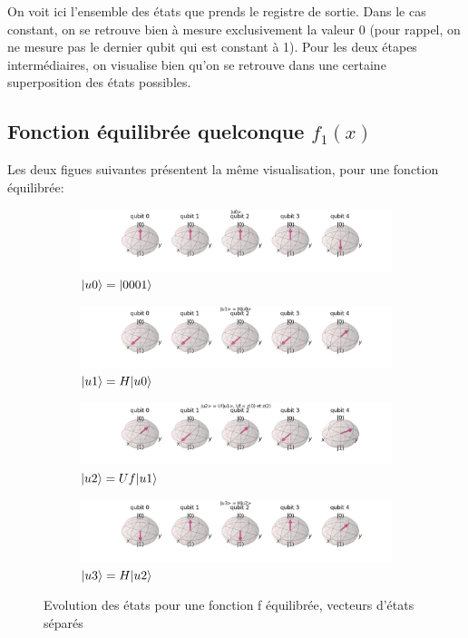 \documentclass[12pt,a4paper]{article}
\DeclarePairedDelimiter\ket{\lvert}{\rangle}
\begin{document}
On voit ici l'ensemble des états que prends le registre de sortie. Dans le cas constant, on se retrouve bien à mesure exclusivement la valeur 0 (pour rappel, on ne mesure pas le dernier qubit qui est constant à 1). Pour les deux étapes intermédiaires, on visualise bien qu'on se retrouve dans une certaine superposition des états possibles.

\pagebreak

\subsection{Fonction équilibrée quelconque $f_1(x)$}
Les deux figues suivantes présentent la même visualisation, pour une fonction équilibrée:

\begin{figure}[ht]
  \begin{subfigure}[b]{0.6\textwidth}
      \centering
      \includegraphics[width=\textwidth]{images/visualization_eq_1_u0.png}
      \caption{$\ket{u0}=\ket{0001}$}
  \end{subfigure}
  \begin{subfigure}[b]{0.6\textwidth}
      \centering
      \includegraphics[width=\textwidth]{images/visualization_eq_1_u1.png}
      \caption{$\ket{u1}=H\ket{u0}$}
  \end{subfigure}
  \begin{subfigure}[b]{0.6\textwidth}
      \centering
      \includegraphics[width=\textwidth]{images/visualization_eq_1_u2.png}
      \caption{$\ket{u2}=Uf\ket{u1}$}
  \end{subfigure}
  \begin{subfigure}[b]{0.6\textwidth}
    \centering
    \includegraphics[width=\textwidth]{images/visualization_eq_1_u3.png}
    \caption{$\ket{u3}=H\ket{u2}$}
\end{subfigure}
     \caption{Evolution des états pour une fonction f équilibrée, vecteurs d'états séparés}
\end{figure}
\end{document}
